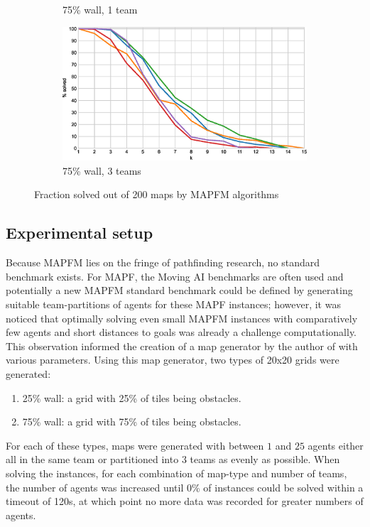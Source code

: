 \documentclass[english]{article}
\newcommand\graphwidth{0.49\textwidth}
\begin{document}
\begin{figure}[b]
\begin{subfigure}{\graphwidth}
			\caption{75\% wall, 1 team}
			\label{fig:r-75-1-p}
		\end{subfigure}
		\begin{subfigure}{\graphwidth}
			\centering
			\includegraphics[width=\linewidth]{img/results/relative-comparison/75-3-p}
			\caption{75\% wall, 3 teams}
			\label{fig:r-75-3-p}
		\end{subfigure}
		\caption{Fraction solved out of 200 maps by MAPFM algorithms}
		\label{fig:r-probs}
	\end{figure}
	
	\restoregeometry
	\subsection{Experimental setup}
	Because MAPFM lies on the fringe of pathfinding research, no standard benchmark exists. For MAPF, the Moving AI benchmarks \cite{sturtevant2012} are often used and potentially a new MAPFM standard benchmark could be defined by generating suitable team-partitions of agents for these MAPF instances; however, it was noticed that optimally solving even small MAPFM instances with comparatively few agents and short distances to goals was already a challenge computationally. This observation informed the creation of a map generator by the author of \cite{jong2021} with various parameters. Using this map generator, two types of 20x20 grids were generated:
	\begin{enumerate}
		\item 25\% wall: a grid with 25\% of tiles being obstacles.
		\item 75\% wall: a grid with 75\% of tiles being obstacles. 
	\end{enumerate}
	For each of these types, maps were generated with between $1$ and $25$ agents either all in the same team or partitioned into $3$ teams as evenly as possible. When solving the instances, for each combination of map-type and number of teams, the number of agents was increased until 0\% of instances could be solved within a timeout of 120s, at which point no more data was recorded for greater numbers of agents.
	
\end{document}
